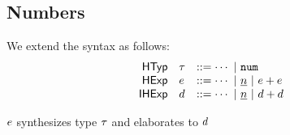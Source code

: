 
\subsection{Numbers}
We extend the syntax as follows:
\[
\begin{array}{rllllll}
\mathsf{HTyp} & \htau & ::= \cdots ~\vert~ \tnum
\\
\mathsf{HExp} & \hexp & ::= \cdots
~\vert~ \hnum{n}
~\vert~ \hadd{\hexp}{\hexp}
\\
\mathsf{IHExp} & \dexp & ::= \cdots
~\vert~ \dnum{n}
~\vert~ \dadd{\dexp}{\dexp}
\end{array}
\]


\vsepRule

\judgbox
  {\elabSyn{\hGamma}{\hexp}{\htau}{\dexp}{\Delta}}
  {$\hexp$ synthesizes type $\htau$ and elaborates to $\dexp$}
\begin{mathpar}


\end{mathpar}


\begin{mathpar}


\end{mathpar}

